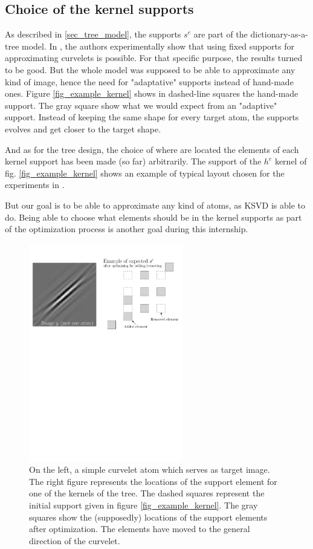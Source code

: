 \subsection{Choice of the kernel supports}

As described in \ref{sec_tree_model}, the supports $s^e$ are part of the dictionary-as-a-tree model. In \cite{chabiron_toward_2015}, the authors experimentally show that using fixed supports for approximating curvelets is possible. For that specific purpose, the results turned to be good. But the whole model was supposed to be able to approximate any kind of image, hence the need for "adaptative" supports instead of hand-made ones. Figure \ref{fig_example_kernel} shows in dashed-line squares the hand-made support. The gray square show what we would expect from an "adaptive" support. Instead of keeping the same shape for every target atom, the supports evolves and get closer to the target shape.

And as for the tree design, the choice of where are located the elements of each kernel support has been made (so far) arbitrarily. The support of the $h^e$ kernel of fig. \ref{fig_example_kernel} shows an example of typical layout chosen for the experiments in \cite{chabiron_optimization_2016}. 

But our goal is to be able to approximate any kind of atoms, as \ac{KSVD} is able to do. Being able to choose what elements should be in the kernel supports as part of the optimization process is another goal during this internship.

\begin{figure}[!ht] \centering
\includegraphics[width=0.6\textwidth]{figures/add-rm-elmts-support.pdf}
\caption{On the left, a simple curvelet atom which serves as target image. The right figure represents the locations of the support element for one of the kernels of the tree. The dashed squares represent the initial support given in figure \ref{fig_example_kernel}. The gray squares show the (supposedly) locations of the support elements after optimization. The elements have moved to the general direction of the curvelet.\label{fig_example_optimal_support}}
\end{figure}

